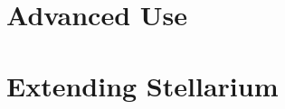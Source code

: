 \documentclass[12pt,fleqn]{book} %
\begin{document}








\part{Advanced Use}



%


\part{Extending Stellarium}




\end{document}
